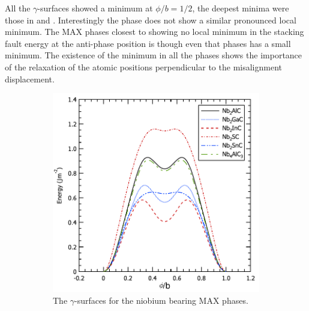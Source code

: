All the $\gamma$-surfaces showed a minimum at $\phi / b = 1/2$, the deepest minima were those in  and . Interestingly the phase  does not show a similar pronounced local minimum. The MAX phases closest to showing no local minimum in the stacking fault energy at the anti-phase position is  though even that phases has a small minimum. The existence of the minimum in all the phases shows the importance of the relaxation of the atomic positions perpendicular to the misalignment displacement.


\begin{figure}
\centering
\begin{subfigure}{5cm}
\centering
\includegraphics[width=\textwidth]{Nb_gamma_surfaces}
\caption{The $\gamma$-surfaces for the niobium bearing MAX phases.\label{fig:Nb_gamma_surfaces}}
\end{subfigure}
~
\begin{subfigure}{5cm}
\centering

\end{subfigure}
\end{figure}
